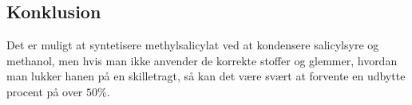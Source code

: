 \subsection*{Konklusion}
Det er muligt at syntetisere methylsalicylat ved at kondensere
salicylsyre og methanol, men hvis man ikke anvender de korrekte
stoffer og glemmer, hvordan man lukker hanen på en skilletragt, så kan det være svært at forvente en udbytte procent på over 
$50\%$.
